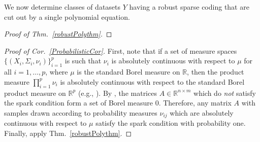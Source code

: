 \documentclass[journal, twocolumn]{IEEEtran}
\newtheorem{lemma}{Lemma}
\begin{document}
We now determine classes of datasets $Y$ having a robust sparse coding that are cut out by a single polynomial equation.

\begin{proof}[Proof of Thm.~\ref{robustPolythm}]
\end{proof}

\begin{proof}[Proof of Cor.~\ref{ProbabilisticCor}]
First, note that if a set of measure spaces $\{(X_i, \Sigma_i, \nu_i)\}_{i=1}^p$ is such that $\nu_i$ is absolutely continuous with respect to $\mu$ for all $i = 1, \ldots, p$, where $\mu$ is the standard Borel measure on $\mathbb{R}$, then the product measure $\prod_{i=1}^p \nu_i$ is absolutely continuous with respect to the standard Borel product measure on $\mathbb{R}^p$ (e.g.,  \cite{folland2013real}). By \cite{Hillar15}, the matrices $A \in \mathbb{R}^{n \times m}$ which do \emph{not} satisfy the spark condition form a set of Borel measure 0. Therefore, any matrix $A$ with samples drawn according to probability measures $\nu_{ij}$ which are absolutely continuous with respect to $\mu$ satisfy the spark condition with probability one.  Finally, apply Thm.~\ref{robustPolythm}.
\end{proof}


\end{document}
